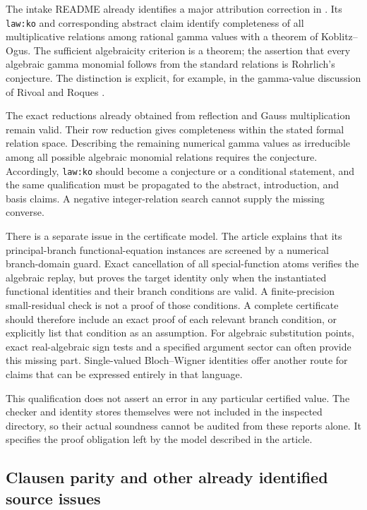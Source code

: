 \documentclass[11pt,a4paper]{article}
\theoremstyle{definition}
\theoremstyle{remark}
\numberwithin{equation}{section}
\begin{document}
The intake README already identifies a major attribution correction
in .  Its \texttt{law:ko}
and corresponding abstract claim identify completeness of all
multiplicative relations among rational gamma values with a theorem
of Koblitz--Ogus.  The sufficient algebraicity criterion is a theorem;
the assertion that every algebraic gamma monomial follows from the
standard relations is Rohrlich's conjecture.  The distinction is
explicit, for example, in the gamma-value discussion of
Rivoal and Roques \cite{RivoalRoques2014}.

The exact reductions already obtained from reflection and Gauss
multiplication remain valid.  Their row reduction gives completeness
within the stated formal relation space.  Describing the remaining
numerical gamma values as irreducible among all possible algebraic
monomial relations requires the conjecture.  Accordingly,
\texttt{law:ko} should become a conjecture or a conditional statement,
and the same qualification must be propagated to the abstract,
introduction, and basis claims.  A negative integer-relation search
cannot supply the missing converse.

There is a separate issue in the certificate model.  The article
explains that its principal-branch functional-equation instances
are screened by a numerical branch-domain guard.  Exact cancellation
of all special-function atoms verifies the algebraic replay, but
proves the target identity only when the instantiated functional
identities and their branch conditions are valid.  A finite-precision
small-residual check is not a proof of those conditions.  A complete
certificate should therefore include an exact proof of each relevant
branch condition, or explicitly list that condition as an assumption.
For algebraic substitution points, exact real-algebraic sign tests
and a specified argument sector can often provide this missing part.
Single-valued Bloch--Wigner identities offer another route for claims
that can be expressed entirely in that language.

This qualification does not assert an error in any particular
certified value.  The checker and identity stores themselves were
not included in the inspected directory, so their actual soundness
cannot be audited from these reports alone.  It specifies the proof
obligation left by the model described in the article.

\subsection{Clausen parity and other already identified source issues}
\label{audit:additional}
\end{document}
